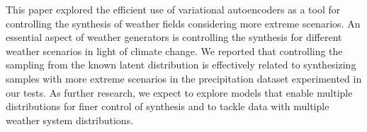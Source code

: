 \documentclass{article}
\begin{document}
This paper explored the efficient use of variational autoencoders as a tool for controlling the synthesis of weather fields considering more extreme scenarios. An essential aspect of weather generators is controlling the synthesis for different weather scenarios in light of climate change. We reported that controlling the sampling from the known latent distribution is effectively related to synthesizing samples with more extreme scenarios in the precipitation dataset experimented in our tests. As further research, we expect to explore models that enable multiple distributions for finer control of synthesis and to tackle data with multiple weather system distributions. 




\end{document}
